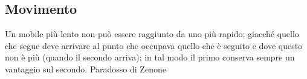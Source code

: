 \pagebreak

\subsection{Movimento}\label{movimento}

\begin{changemargin}{0.3cm}{0.3cm}\begin{enfasi}{Un mobile più lento non può essere raggiunto da uno più rapido; giacché quello che segue deve arrivare al punto che occupava quello che è seguito e dove questo non è più (quando il secondo arriva); in tal modo il primo conserva sempre un vantaggio sul secondo. Paradosso di Zenone}
\end{enfasi}\end{changemargin}\medskip

